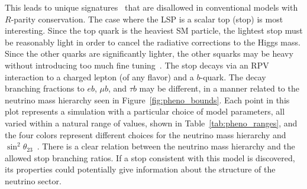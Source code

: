 This leads to unique signatures~\cite{FileviezPerez:2012mj, Perez:2013kla,
Ovrut:2012wg, Ovrut:2014rba, Ovrut:2015uea} that are disallowed in conventional
models with $R$-parity conservation.
The case where the LSP is a scalar top (stop) is most interesting.
Since the top quark is the heaviest SM particle, the lightest stop must be
reasonably light in order to cancel the radiative corrections to the Higgs
mass.
Since the other quarks are significantly lighter, the other squarks may be
heavy without introducing too much fine tuning~\cite{Barbieri:1987fn,deCarlos:1993yy}.
The stop decays via an RPV interaction to a charged lepton (of any
flavor) and a $b$-quark.
The decay branching fractions to $e b$, $\mu b$, and $\tau b$ may be different,
in a manner related to the neutrino mass
hierarchy seen in Figure~\ref{fig:pheno_bounds}.
Each point in this plot represents a simulation with a particular choice of
model parameters, all varied within a natural range of values, shown in
Table~\ref{tab:pheno_ranges}, and the four colors represent different choices
for the neutrino mass hierarchy and 
$\sin^2\theta_{23}$~\cite{Marshall:2014cwa,Marshall:2014kea}.
There is a clear relation between the neutrino mass hierarchy and the allowed
stop branching ratios.
If a stop consistent with this model is discovered, its properties could
potentially give information about the structure of the neutrino sector.

